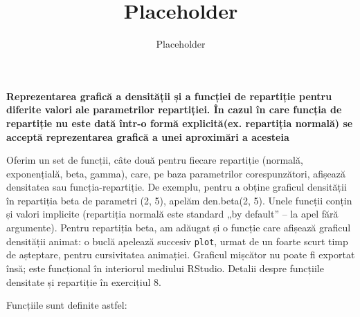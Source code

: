 \documentclass[12pt]{article}
\title{Placeholder}
\author{Placeholder}
\begin{document}
	\textbf{Reprezentarea grafică a densității și a funcției de repartiție pentru diferite valori ale
		parametrilor repartiției. În cazul în care funcția de repartiție nu este dată într-o formă
		explicită(ex. repartiția normală) se acceptă reprezentarea grafică a unei aproximări a acesteia}\vspace{5mm}
	
	Oferim un set de funcții, câte două pentru fiecare repartiție (normală, exponențială, beta, gamma), care, pe baza parametrilor corespunzători, afișează densitatea sau funcția-repartiție. De exemplu, pentru a obține graficul densității în repartiția beta de parametri (2, 5), apelăm den.beta(2, 5). Unele funcții conțin și valori implicite (repartiția normală este standard „by default” – la apel fără argumente).
	Pentru repartiția beta, am adăugat și o funcție care afișează graficul densității animat: o buclă apelează succesiv \lstinline|plot|, urmat de un foarte scurt timp de așteptare, pentru cursivitatea animației. Graficul mișcător nu poate fi exportat însă; este funcțional în interiorul mediului RStudio. Detalii despre funcțiile densitate și repartiție în exercițiul 8. \\ \par
	Funcțiile sunt definite astfel: \\
	
\end{document}
